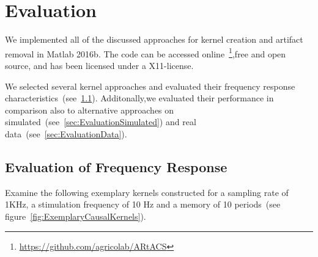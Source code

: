 \documentclass[a4paper]{article}
\newcommand{\figref}[1]{(see figure~\ref{#1})}
\begin{document}
\section{Evaluation}
We implemented all of the discussed approaches for kernel creation and artifact removal in Matlab 2016b. The code can be accessed online~\footnote{\url{https://github.com/agricolab/ARtACS}},free and open source, and has been licensed under a X11-license.

We selected several kernel approaches and evaluated their frequency response characteristics~(see~\ref{sec:EvaluationFreq}). Additonally,we evaluated their performance in comparison also to alternative approaches on simulated~(see~\ref{sec:EvaluationSimulated}) and real data~(see~\ref{sec:EvaluationData}).

\subsection{Evaluation of Frequency Response}\label{sec:EvaluationFreq}

Examine the following exemplary kernels constructed for a sampling rate of 1KHz, a stimulation frequency of 10 Hz and a memory of 10 periods~\figref{fig:ExemplaryCausalKernels}.
\end{document}
